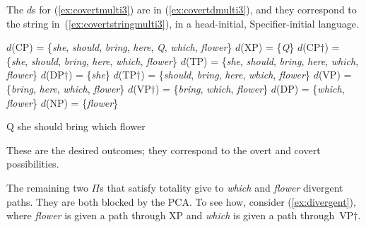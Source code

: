 \documentclass[output=paper]{langsci/langscibook}
\begin{document}
The $d$s for (\ref{ex:covertmulti3}) are in (\ref{ex:covertdmulti3}), and they correspond to the string in~(\ref{ex:covertstringmulti3}), in a head-initial, Specifier-initial language.
\begin{exe}
	\ex \label{ex:covertdmulti3}
	\begin{xlist}
		\ex $d$(CP) = \{\emph{she}, \emph{should}, \emph{bring}, \emph{here}, \emph{Q}, \emph{which}, \emph{flower}\}
		\ex $d$(XP) = \{\emph{Q}\}
		\ex $d$(CP$\dag$) = \{\emph{she}, \emph{should}, \emph{bring}, \emph{here}, \emph{which}, \emph{flower}\}
		\ex $d$(TP) = \{\emph{she}, \emph{should}, \emph{bring}, \emph{here}, \emph{which}, \emph{flower}\}
		\ex $d$(DP$\dag$) = \{\emph{she}\}
		\ex $d$(TP$\dag$) = \{\emph{should}, \emph{bring}, \emph{here}, \emph{which}, \emph{flower}\}
		\ex $d$(VP) = \{\emph{bring}, \emph{here}, \emph{which}, \emph{flower}\}
		\ex $d$(VP$\dag$) = \{\emph{bring}, \emph{which}, \emph{flower}\}
		\ex $d$(DP) = \{\emph{which}, \emph{flower}\}
		\ex $d$(NP) = \{\emph{flower}\}
	\end{xlist}
	\ex \label{ex:covertstringmulti3} Q she should bring which flower
\end{exe}

These are the desired outcomes; they correspond to the overt and covert  possibilities.

The remaining two $\Pi$s that satisfy totality give to \emph{which} and
\emph{flower} divergent paths. They are both blocked by the \gls{PCA}. To see
how, consider (\ref{ex:divergent}), where \emph{flower} is given a path through
XP and \emph{which} is given a path through~VP$\dag$.%

\end{document}
